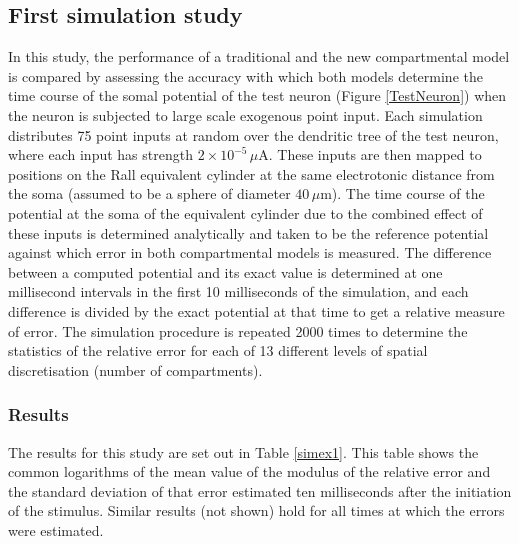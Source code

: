 \subsection{First simulation study}\label{sim1}

In this study, the performance of a traditional and the new
compartmental model is compared by assessing the accuracy with
which both models determine the time course of the somal potential
of the test neuron (Figure \ref{TestNeuron}) when the neuron is
subjected to large scale exogenous point input. Each simulation
distributes 75 point inputs at random over the dendritic tree of
the test neuron, where each input has strength
$2\times10^{-5}\,\mu$A. These inputs are then mapped to positions
on the Rall equivalent cylinder at the same electrotonic distance
from the soma (assumed to be a sphere of diameter $40\,\mu$m). The
time course of the potential at the soma of the equivalent
cylinder due to the combined effect of these inputs is determined
analytically and taken to be the reference potential against which
error in both compartmental models is measured. The difference
between a computed potential and its exact value is determined at
one millisecond intervals in the first 10 milliseconds of the
simulation, and each difference is divided by the exact potential
at that time to get a relative measure of error. The simulation
procedure is repeated 2000 times to determine the statistics of
the relative error for each of 13 different levels of spatial
discretisation (number of compartments).

\subsubsection{Results}

The results for this study are set out in Table \ref{simex1}. This
table shows the common logarithms of the mean value of the modulus
of the relative error and the standard deviation of that error
estimated ten milliseconds after the initiation of the stimulus.
Similar results (not shown) hold for all times at which the errors
were estimated.

